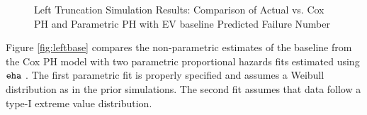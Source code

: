 \begin{figure}[h!]
	\centering
	\quad
	\quad
	\quad
	\caption{Left Truncation Simulation Results: Comparison of Actual vs. Cox PH and Parametric PH with EV baseline Predicted Failure Number}
	\label{fig:lefttruncation}
\end{figure}
Figure \ref{fig:leftbase} compares the non-parametric estimates of the baseline from the Cox PH model with two parametric proportional hazards fits estimated using $\tt eha$ \citep{eha}.  The first parametric fit is properly specified and assumes a  Weibull distribution as in the prior simulations. The second fit assumes that data follow a type-I extreme value distribution.
